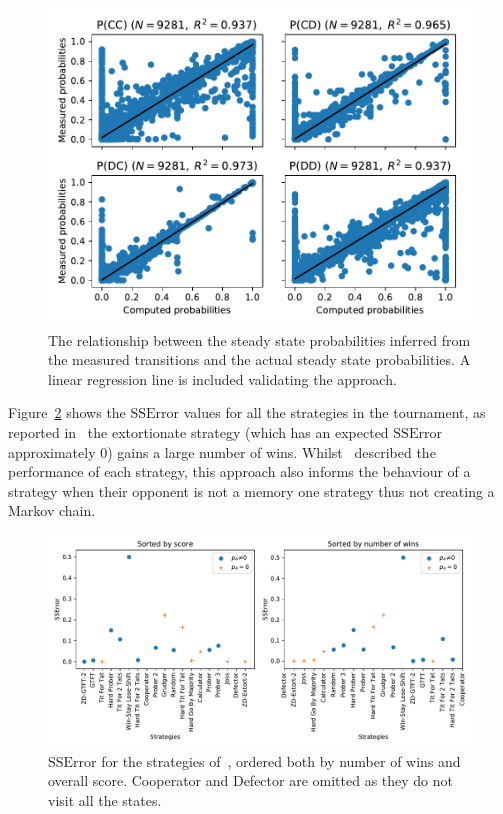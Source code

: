 \documentclass[a4paper]{article}
\begin{document}
\begin{figure}[!htbp]
    \centering
    \includegraphics[width=.8\textwidth]{./assets/img/computed_probabilities_vs_theoretic_probabilities/main.pdf}
    \caption{The
        relationship between the steady state probabilities inferred from the
        measured transitions and the actual steady state probabilities. A linear
        regression line is included validating the approach.}
    \label{fig:computed_probabilities_vs_theoretic_probabilities}
\end{figure}

Figure~\ref{fig:SSError_overall_in_stewart_plotkin} shows the \(\text{SSError}\)
values for all the strategies in the tournament, as reported
in~\cite{Stewart2012} the extortionate strategy (which has an expected
\(\text{SSError}\) approximately 0) gains a large number of wins.
Whilst~\cite{Stewart2012} described the performance of each strategy, this
approach also informs the behaviour of a strategy when their opponent is not a
memory one strategy thus not creating a Markov chain.

\begin{figure}[!htbp]
    \centering
    \includegraphics[width=.8\textwidth]{./assets/img/SSError_overall_in_stewart_plotkin/main.pdf}
    \caption{\(\text{SSError}\) for the strategies of~\cite{Stewart2012}, ordered both by
    number of wins and overall score. Cooperator and Defector are omitted as
    they do not visit all the states.}
    \label{fig:SSError_overall_in_stewart_plotkin}
\end{figure}
\end{document}
